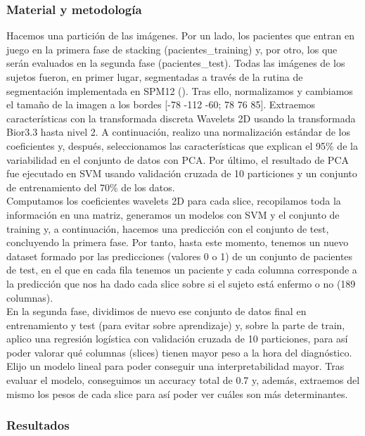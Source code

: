 \subsubsection{Material y metodología}

Hacemos una partición de las imágenes. Por un lado, los pacientes que entran en juego en la primera fase de stacking (pacientes\_training) y, por otro, los que serán evaluados en la segunda fase (pacientes\_test). Todas las imágenes de los sujetos fueron, en primer lugar, segmentadas a través de la rutina de segmentación implementada en SPM12 (\cite{spm}). Tras ello, normalizamos y cambiamos el tamaño de la imagen a los bordes [-78 -112 -60; 78 76 85]. Extraemos características con la transformada discreta Wavelets 2D usando la transformada Bior3.3 hasta nivel 2. A continuación, realizo una normalización estándar de los coeficientes y, después, seleccionamos las características que explican el 95\% de la variabilidad en el conjunto de datos con PCA. Por último, el resultado de PCA fue ejecutado en SVM usando validación cruzada de 10 particiones y un conjunto de entrenamiento del 70\% de los datos. \\

Computamos los coeficientes wavelets 2D para cada slice, recopilamos toda la información en una matriz, generamos un modelos con SVM y el conjunto de training y, a continuación, hacemos una predicción con el conjunto de test, concluyendo la primera fase. Por tanto, hasta este momento, tenemos un nuevo dataset formado por las predicciones (valores 0 o 1) de un conjunto de pacientes de test, en el que en cada fila tenemos un paciente y cada columna corresponde a la predicción que nos ha dado cada slice sobre si el sujeto está enfermo o no (189 columnas). \\

En la segunda fase, dividimos de nuevo ese conjunto de datos final en entrenamiento y test (para evitar sobre aprendizaje) y, sobre la parte de train, aplico una regresión logística con validación cruzada de 10 particiones, para así poder valorar qué columnas (slices) tienen mayor peso a la hora del diagnóstico. Elijo un modelo lineal para poder conseguir una interpretabilidad mayor. Tras evaluar el modelo, conseguimos un accuracy total de 0.7 y, además, extraemos del mismo los pesos de cada slice para así poder ver cuáles son más determinantes.

\subsubsection{Resultados}


